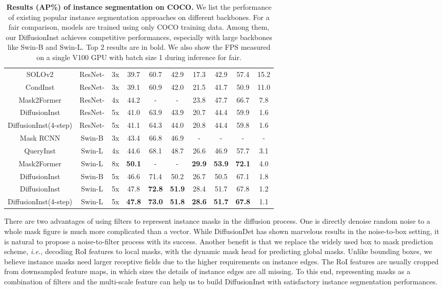 \documentclass{article}
\begin{document}
\begin{table*}[thb]
\begin{tabular}{c|c|c|c|cc|ccc|c}
  SOLOv2 &  ResNet- &3x &39.7  & 60.7   & 42.9  & 17.3  &42.9  & 57.4& 15.2\\
  CondInst &  ResNet- &3x &39.1  &  60.9 & 42.0  &21.5   & 41.7  & 50.9& 11.0 \\
  Mask2Former & ResNet- &4x &44.2 &-&-&23.8 &47.7 &66.7 &7.8\\
  DiffusionInst &  ResNet- &5x & 41.0&63.9&43.9&20.7&44.4&59.9& 1.6\\ 
  DiffusionInst(4-step) &  ResNet- &5x &41.1&64.3&44.0&20.8&44.4&59.8 &1.6\\ \midrule
Mask RCNN &  Swin-B & 3x & 43.4  & 66.8  & {46.9}  & -  & -  & - &-\\
QueryInst & Swin-L &4x &44.6& 68.1& 48.7& 26.6 &46.9 &57.7 &3.1\\ 
  Mask2Former & Swin-L &8x &\textbf{50.1}&-&-& \textbf{29.9}& \textbf{53.9} &\textbf{72.1} &4.0\\
DiffusionInst &  Swin-B &5x & 46.6&{71.4}&{50.2}&26.7&50.5&67.1& 1.8 \\
DiffusionInst &  Swin-L &5x &47.8&\textbf{72.8}&\textbf{51.9}&28.4&51.7&67.8&  1.2 \\
  DiffusionInst(4-step) &  Swin-L &5x& \textbf{47.8}&\textbf{73.0}&\textbf{51.8}&\textbf{28.6}&\textbf{51.7}&\textbf{67.8}&1.1 \\
 \bottomrule
 \end{tabular}\caption{\textbf{Results (AP\%) of instance segmentation on COCO.} We list the performance of existing popular instance segmentation approaches on different backbones. For a fair comparison, models are trained using only COCO training data. Among them, our DiffusionInst achieves competitive performances, especially with large backbones like Swin-B and Swin-L. Top 2 results are in bold. We also show the FPS measured on a single V100 GPU with batch size 1 during inference for fair.}
\label{sota}
\end{table*}

There are two advantages of using filters to represent instance masks in the diffusion process. One is directly denoise random noise to a whole mask figure is much more complicated than a vector. While DiffusionDet has shown marvelous results in the noise-to-box setting, it is natural to propose a noise-to-filter process with its success. Another benefit is that we replace the widely used box to mask prediction scheme, \emph{i.e.}, decoding RoI features to local masks, with the dynamic mask head for predicting global masks. Unlike bounding boxes, we believe instance masks need larger receptive fields due to the higher requirements on instance edges. The RoI features are usually cropped from downsampled feature maps, in which sizes the details of instance edges are all missing. To this end, representing masks as a combination of filters and the multi-scale feature can help us to build DiffusionInst with satisfactory instance segmentation performances. 
\end{document}
